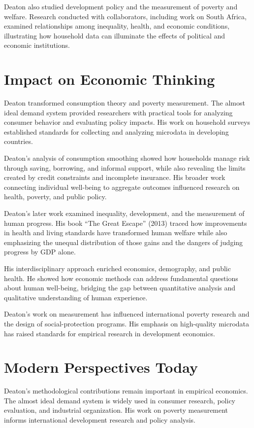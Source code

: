 Deaton also studied development policy and the measurement of poverty and welfare.
Research conducted with collaborators, including work on South Africa, examined
relationships among inequality, health, and economic conditions, illustrating how
household data can illuminate the effects of political and economic institutions.

\section{Impact on Economic Thinking}
Deaton transformed consumption theory and poverty measurement. The almost ideal
demand system provided researchers with practical tools for analyzing consumer
behavior and evaluating policy impacts. His work on household surveys established
standards for collecting and analyzing microdata in developing countries.

Deaton's analysis of consumption smoothing showed how households manage risk
through saving, borrowing, and informal support, while also revealing the limits
created by credit constraints and incomplete insurance. His broader work connecting
individual well-being to aggregate outcomes influenced research on health, poverty,
and public policy.

Deaton's later work examined inequality, development, and the measurement of
human progress. His book ``The Great Escape'' (2013) traced how improvements in
health and living standards have transformed human welfare while also emphasizing
the unequal distribution of those gains and the dangers of judging progress by
GDP alone.

His interdisciplinary approach enriched economics, demography, and public health.
He showed how economic methods can address fundamental questions about human
well-being, bridging the gap between quantitative analysis and qualitative
understanding of human experience.

Deaton's work on measurement has influenced international poverty research and
the design of social-protection programs. His emphasis on high-quality microdata
has raised standards for empirical research in development economics.

\section{Modern Perspectives Today}
Deaton's methodological contributions remain important in empirical economics.
The almost ideal demand system is widely used in consumer research, policy
evaluation, and industrial organization. His work on poverty measurement informs
international development research and policy analysis.

